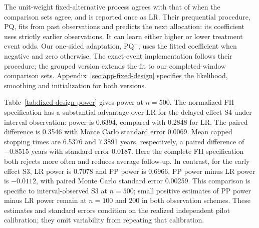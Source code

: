\documentclass[12pt]{article}
\theoremstyle{definition}
\theoremstyle{remark}
\begin{document}
The unit-weight fixed-alternative process agrees with that of \citet{TerSchureEtAl2024} when the comparison sets agree, and is reported once as LR. Their prequential procedure, PQ, fits from past observations and predicts the next allocation: its coefficient uses strictly earlier observations. It can learn either higher or lower treatment event odds. Our one-sided adaptation, PQ$^-$, uses the fitted coefficient when negative and zero otherwise. The exact-event implementation follows their procedure; the grouped version extends the fit to our completed-window comparison sets. Appendix~\ref{sec:app-fixed-design} specifies the likelihood, smoothing and initialization for both versions.

Table~\ref{tab:fixed-design-power} gives power at $n=500$. The normalized FH specification has a substantial advantage over LR for the delayed effect S4 under interval observation: power is 0.6394, compared with 0.2848 for LR. The paired difference is 0.3546 with Monte Carlo standard error 0.0069. Mean capped stopping times are 6.5376 and 7.3891 years, respectively, a paired difference of $-0.8515$ years with standard error 0.0187. Here the complete FH specification both rejects more often and reduces average follow-up. In contrast, for the early effect S3, LR power is 0.7078 and PP power is 0.6966. PP power minus LR power is $-0.0112$, with paired Monte Carlo standard error 0.00259. This comparison is specific to interval-observed S3 at $n=500$; small positive estimates of PP power minus LR power remain at $n=100$ and $200$ in both observation schemes. These estimates and standard errors condition on the realized independent pilot calibration; they omit variability from repeating that calibration.
\end{document}
